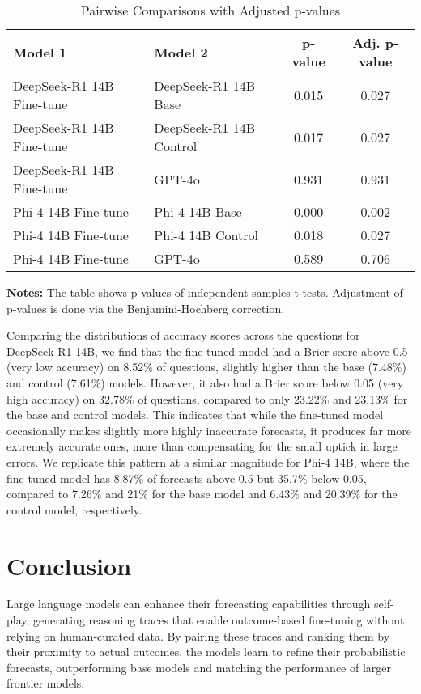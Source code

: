 \documentclass{article}
\begin{document}
\begin{table}[htbp]
  \centering
  \caption{Pairwise Comparisons with Adjusted p-values}
  \label{tab:pairwise}
  \begin{tabular}{l l c c}
    \toprule
    \textbf{Model 1} & \textbf{Model 2} & \textbf{p-value} & \textbf{Adj. p-value} \\
    \midrule
    DeepSeek-R1 14B Fine-tune & DeepSeek-R1 14B Base    & 0.015 & 0.027 \\
    DeepSeek-R1 14B Fine-tune & DeepSeek-R1 14B Control & 0.017 & 0.027 \\
    DeepSeek-R1 14B Fine-tune & GPT-4o                  & 0.931 & 0.931 \\
    Phi-4 14B Fine-tune       & Phi-4 14B Base          & 0.000 & 0.002 \\
    Phi-4 14B Fine-tune       & Phi-4 14B Control       & 0.018 & 0.027 \\
    Phi-4 14B Fine-tune       & GPT-4o                  & 0.589 & 0.706 \\
    \bottomrule
  \end{tabular}
  
  \vspace{1ex}
  \textbf{Notes:} The table shows p-values of independent samples t-tests. Adjustment of p-values is done via the Benjamini-Hochberg correction.
\end{table}

Comparing the distributions of accuracy scores across the questions for DeepSeek‑R1 14B, we find that the fine‑tuned model had a Brier score above 0.5 (very low accuracy) on 8.52\% of questions, slightly higher than the base (7.48\%) and control (7.61\%) models. However, it also had a Brier score below 0.05 (very high accuracy) on 32.78\% of questions, compared to only 23.22\% and 23.13\% for the base and control models. This indicates that while the fine‑tuned model occasionally makes slightly more highly inaccurate forecasts, it produces far more extremely accurate ones, more than compensating for the small uptick in large errors. We replicate this pattern at a similar magnitude for Phi‑4 14B, where the fine‑tuned model has 8.87\% of forecasts above 0.5 but 35.7\% below 0.05, compared to 7.26\% and 21\% for the base model and 6.43\% and 20.39\% for the control model, respectively.

\section{Conclusion}
Large language models can enhance their forecasting capabilities through self-play, generating reasoning traces that enable outcome-based fine-tuning without relying on human-curated data. By pairing these traces and ranking them by their proximity to actual outcomes, the models learn to refine their probabilistic forecasts, outperforming base models and matching the performance of larger frontier models.



\end{document}

